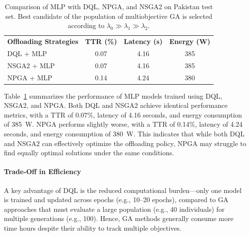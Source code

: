 \documentclass[preprint,3p,authoryear]{elsarticle}
\begin{document}
\begin{table}[H]
\centering


\begin{tabular}{lccc}

    \toprule

\textbf{Offloading Strategies} & \textbf{TTR (\%)} & \textbf{Latency (s)} & \textbf{Energy (W)} \\

\middlerule

DQL + MLP 
 & 0.07
 & 4.16 
 & 385 \\

\hline

NSGA2 + MLP 
 & 0.07 
 & 4.16
 & 385 \\
 
NPGA + MLP 
 & 0.14 
 & 4.24 
 & 380 \\

\bottomrule


\end{tabular}

\caption{Comparison of MLP with DQL, NPGA, and NSGA2 on Pakistan test set. Best candidate of the population of multiobjective GA is selected according to \(\lambda_0 \gg \lambda_1 \gg \lambda_2\).}\label{tab:mlp_comparison}
\end{table}

Table~\ref{tab:mlp_comparison} summarizes the performance of MLP models trained using DQL, NSGA2, and NPGA. Both DQL and NSGA2 achieve identical performance metrics, with a TTR of 0.07\%, latency of 4.16 seconds, and energy consumption of 385~W. NPGA performs slightly worse, with a TTR of 0.14\%, latency of 4.24 seconds, and energy consumption of 380~W. This indicates that while both DQL and NSGA2 can effectively optimize the offloading policy, NPGA may struggle to find equally optimal solutions under the same conditions.


\paragraph{Trade-Off in Efficiency}
A key advantage of DQL is the reduced computational burden—only one model is trained and updated across epochs (e.g., 10–20 epochs), compared to GA approaches that must evaluate a large population (e.g., 40 individuals) for multiple generations (e.g., 100). Hence, GA methods generally consume more time hours despite their ability to track multiple objectives.
\end{document}
